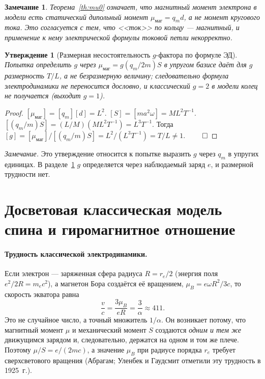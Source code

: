 \documentclass[12pt,a4paper]{article}
\newtheorem{proposition}{Утверждение}
\newtheorem{remark}{Замечание}
\begin{document}
\begin{remark}
Теорема~\ref{th:mu0} означает, что магнитный момент электрона в модели есть
\emph{статический} дипольный момент $\mu_{\text{маг}}=q_m d$, а не момент
кругового тока. Это согласуется с тем, что <<ток>> по кольцу --- магнитный, и
применение к нему электрической формулы токовой петли некорректно.
\end{remark}

\begin{proposition}[Размерная несостоятельность $g$-фактора по формуле ЭД]
Попытка определить $g$ через $\mu_{\text{маг}}=g(q_m/2m)S$ в упругом базисе даёт
для $g$ размерность $T/L$, а не безразмерную величину; следовательно формула
электродинамики не переносится дословно, и классический $g=2$ в модели колец не
получается (выходит $g=1$).
\end{proposition}
\begin{proof}
$[\mu_{\text{маг}}]=[q_m][d]=L^2$. $[S]=[m a^2\omega]=M L^2 T^{-1}$.
$[(q_m/m)S]=(L/M)(ML^2T^{-1})=L^3T^{-1}$. Тогда
$[g]=[\mu_{\text{маг}}]/[(q_m/m)S]=L^2/(L^3T^{-1})=T/L\neq 1$. $\qed$
\end{proof}


\noindent\textit{Замечание.} Это утверждение относится к попытке выразить $g$ через $q_m$ в упругих единицах. В разделе~\ref{sec:spin_subluminal} $g$ определяется через наблюдаемый заряд $e$, и размерной трудности нет.

\section{Досветовая классическая модель спина и гиромагнитное отношение}
\label{sec:spin_subluminal}

\paragraph{Трудность классической электродинамики.} Если электрон --- заряженная
сфера радиуса $R=r_e/2$ (энергия поля $e^2/2R=m_ec^2$), а магнетон Бора
создаётся её вращением, $\mu_B=e\omega R^2/3c$, то скорость экватора равна
\begin{equation}
\frac{v}{c}=\frac{3\mu_B}{eR}=\frac{3}{\alpha}\approx411 .
\label{eq:v_classical}
\end{equation}
Это не случайное число, а точный множитель $1/\alpha$. Он возникает потому, что
магнитный момент $\mu$ и механический момент $S$ создаются \emph{одним и тем же}
движущимся зарядом и, следовательно, держатся на одном и том же плече. Поэтому
$\mu/S=e/(2mc)$, а значение $\mu_B$ при радиусе порядка $r_e$ требует сверхсветового
вращения (Абрагам; Уленбек и Гаудсмит отметили эту трудность в 1925~г.).
\end{document}
